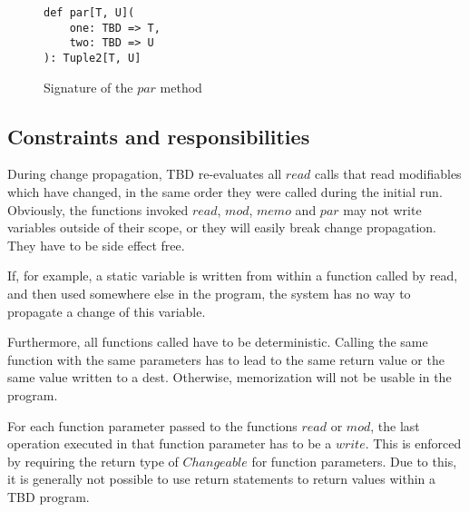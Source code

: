 \begin{figure}
\begin{lstlisting}[frame=single,basicstyle=\ttfamily]
def par[T, U](
    one: TBD => T, 
    two: TBD => U
): Tuple2[T, U] 
\end{lstlisting}
\caption{Signature of the $par$ method}
\label{code:par}
\end{figure}

\subsection{Constraints and responsibilities}
\label{sec:constraints}
During change propagation, TBD re-evaluates all $read$ calls that read modifiables which have changed, in the same order they were called during the initial run. Obviously, the functions invoked $read$, $mod$, $memo$ and $par$ may not write variables outside of their scope, or they will easily break change propagation. They have to be side effect free. 

If, for example, a static variable is written from within a function called by read, and then used somewhere else in the program, the system has no way to propagate a change of this variable.

Furthermore, all functions called have to be deterministic. Calling the same function with the same parameters has to lead to the same return value or the same value written to a dest. Otherwise, memorization will not be usable in the program.

For each function parameter passed to the functions $read$ or $mod$, the last operation executed in that function parameter has to be a $write$. This is enforced by requiring the return type of $Changeable$ for function parameters.
Due to this, it is generally not possible to use return statements to return values within a TBD program.  